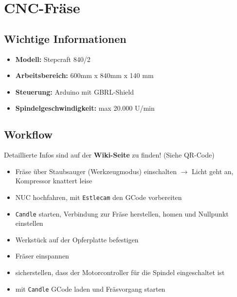 \documentclass{article}
\begin{document}
	
	\noindent
	\begin{minipage}{0.25\textwidth}
		\section*{CNC-Fräse}
	\end{minipage}
	\begin{minipage}{0.75\textwidth}
		\begin{flushright}
			
		\end{flushright}	
	\end{minipage}%
	
	\subsection*{Wichtige Informationen}
	\begin{itemize}
		\item \textbf{Modell:} Stepcraft 840/2
		\item \textbf{Arbeitsbereich:} 600mm x 840mm x 140 mm
		\item \textbf{Steuerung:} Arduino mit GBRL-Shield
		\item \textbf{Spindelgeschwindigkeit:} max 20.000 U/min
	\end{itemize}
	
	\noindent\dotfill
	\subsection*{Workflow}
	Detaillierte Infos sind auf der\textbf{ Wiki-Seite} zu finden! (Siehe QR-Code)
	\begin{itemize}
		\item Fräse über Staubsauger (Werkzeugmodus) einschalten $\rightarrow$ Licht geht an, Kompressor knattert leise
		\item NUC hochfahren, mit \texttt{Estlecam} den GCode vorbereiten
		\item \texttt{Candle} starten, Verbindung zur Fräse herstellen, homen und Nullpunkt einstellen
		\item Werkstück auf der Opferplatte befestigen
		\item Fräser einspannen
		\item sicherstellen, dass der Motorcontroller für die Spindel eingeschaltet ist
		\item mit \texttt{Candle} GCode laden und Fräsvorgang starten
	\end{itemize}
	
\end{document}
